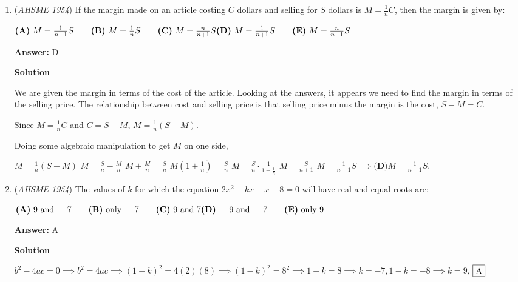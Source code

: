 \begin{enumerate}
\textbf{Solution}

$\frac{2x^2-x}{(x+1)(x-2)}-\frac{4+x}{(x+1)(x-2)} = \frac{2x^2-2x-4}{(x+1)(x-2)}$

 This can be factored as $\frac{(2)(x^2-x-2)}{(x+1)(x-2)} \implies \frac{(2)(x+1)(x-2)}{(x+1)(x-2)}$, which cancels out to $2 \implies \boxed{\textbf{(B)} \text{The expression has only the value 2}}$.

 


	\item (\textit{AHSME 1954}) If the margin made on an article costing $C$ dollars and selling for $S$ dollars is $M=\frac{1}{n}C$, then the margin is given by: 


 $\textbf{(A)}\ M=\frac{1}{n-1}S\qquad\textbf{(B)}\ M=\frac{1}{n}S\qquad\textbf{(C)}\ M=\frac{n}{n+1}S\\ \textbf{(D)}\ M=\frac{1}{n+1}S\qquad\textbf{(E)}\ M=\frac{n}{n-1}S$

 \textbf{Answer: }D



\textbf{Solution}

We are given the margin in terms of the cost of the article. Looking at the answers, it appears we need to find the margin in terms of the selling price. The relationship between cost and selling price is that selling price minus the margin is the cost, $S-M=C$.

 Since $M=\frac{1}{n}C$ and $C=S-M$, $M=\frac{1}{n}(S-M)$.

 Doing some algebraic manipulation to get $M$ on one side,

 $M=\frac{1}{n}(S-M)$
$M=\frac{S}{n}-\frac{M}{n}$
$M+\frac{M}{n}=\frac{S}{n}$
$M(1+\frac{1}{n})=\frac{S}{n}$
$M=\frac{S}{n}\cdot \frac{1}{1+\frac{1}{n}}$
$M=\frac{S}{n+1}$
$M=\frac{1}{n+1}S \implies \boxed{\textbf{(D)} M=\frac{1}{n+1}S}$.

 


	\item (\textit{AHSME 1954}) The values of $k$ for which the equation $2x^2-kx+x+8=0$ will have real and equal roots are: 


 $\textbf{(A)}\ 9\text{ and }-7\qquad\textbf{(B)}\ \text{only }-7\qquad\textbf{(C)}\ \text{9 and 7}\\ \textbf{(D)}\ -9\text{ and }-7\qquad\textbf{(E)}\ \text{only 9}$

 \textbf{Answer: }A



\textbf{Solution}

$b^2-4ac=0\implies b^2=4ac\implies (1-k)^2=4(2)(8)\implies (1-k)^2=8^2\implies 1-k=8\implies k=-7, 1-k=-8\implies k=9$, $\fbox{A}$




\end{enumerate}
